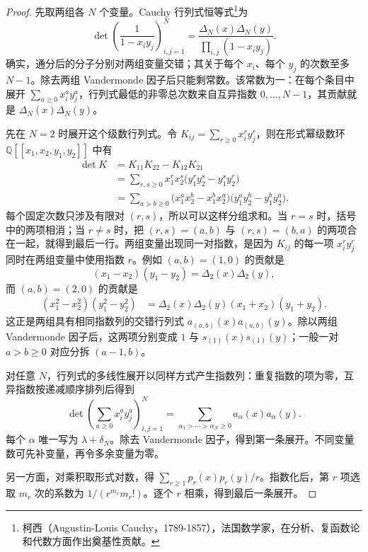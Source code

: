 \begin{proof}
	先取两组各 \(N\) 个变量。Cauchy 行列式恒等式\footnote{柯西（Augustin-Louis Cauchy，1789-1857），法国数学家，在分析、复函数论和代数方面作出奠基性贡献。}为
	\[
		\det\left(\frac1{1-x_i y_j}\right)_{i,j=1}^N =\frac{\Delta_N(x)\Delta_N(y)}{\prod_{i,j}(1-x_i y_j)}.
	\]
	确实，通分后的分子分别对两组变量交错；其关于每个 \(x_i\)、每个 \(y_j\) 的次数至多 \(N-1\)。除去两组 Vandermonde 因子后只能剩常数。该常数为一：在每个条目中展开 \(\sum_{a\ge0}x_i^a y_j^a\)，行列式最低的非零总次数来自互异指数 \(0,\ldots,N-1\)，其贡献就是 \(\Delta_N(x)\Delta_N(y)\)。

	先在 \(N=2\) 时展开这个级数行列式。令 \(K_{ij}=\sum_{r\ge0}x_i^r y_j^r\)，则在形式幂级数环 \(\mathbb Q[\![x_1,x_2,y_1,y_2]\!]\) 中有
	\[
		\begin{aligned}
			\det K &=K_{11}K_{22}-K_{12}K_{21}\\
			&=\sum_{r,s\ge0}x_1^rx_2^s \bigl(y_1^ry_2^s-y_1^sy_2^r\bigr)\\
			&=\sum_{a>b\ge0} \bigl(x_1^ax_2^b-x_1^bx_2^a\bigr) \bigl(y_1^ay_2^b-y_1^by_2^a\bigr).
		\end{aligned}
	\]
	每个固定次数只涉及有限对 \((r,s)\)，所以可以这样分组求和。当 \(r=s\) 时，括号中的两项相消；当 \(r\ne s\) 时，把 \((r,s)=(a,b)\) 与 \((r,s)=(b,a)\) 的两项合在一起，就得到最后一行。两组变量出现同一对指数，是因为 \(K_{ij}\) 的每一项 \(x_i^ry_j^r\) 同时在两组变量中使用指数 \(r\)。例如 \((a,b)=(1,0)\) 的贡献是
	\[
		(x_1-x_2)(y_1-y_2)=\Delta_2(x)\Delta_2(y),
	\]
	而 \((a,b)=(2,0)\) 的贡献是
	\[
		\begin{aligned}
			(x_1^2-x_2^2)(y_1^2-y_2^2) &=\Delta_2(x)\Delta_2(y)(x_1+x_2)(y_1+y_2).
		\end{aligned}
	\]
	这正是两组具有相同指数列的交错行列式 \(a_{(a,b)}(x)a_{(a,b)}(y)\)。除以两组 Vandermonde 因子后，这两项分别变成 \(1\) 与 \(s_{(1)}(x)s_{(1)}(y)\)；一般一对 \(a>b\ge0\) 对应分拆 \((a-1,b)\)。

	对任意 \(N\)，行列式的多线性展开以同样方式产生指数列：重复指数的项为零，互异指数按递减顺序排列后得到
	\[
		\det\left(\sum_{a\ge0}x_i^a y_j^a\right)_{i,j=1}^N =\sum_{\alpha_1>\cdots>\alpha_N\ge0}a_\alpha(x)a_\alpha(y).
	\]
	每个 \(\alpha\) 唯一写为 \(\lambda+\delta_N\)。除去 Vandermonde 因子，得到第一条展开。不同变量数可先补变量，再令多余变量为零。

	另一方面，对乘积取形式对数，得 \(\sum_{r\ge1}p_r(x)p_r(y)/r\)。指数化后，第 \(r\) 项选取 \(m_r\) 次的系数为 \(1/(r^{m_r}m_r!)\)。逐个 \(r\) 相乘，得到最后一条展开。
\end{proof}

